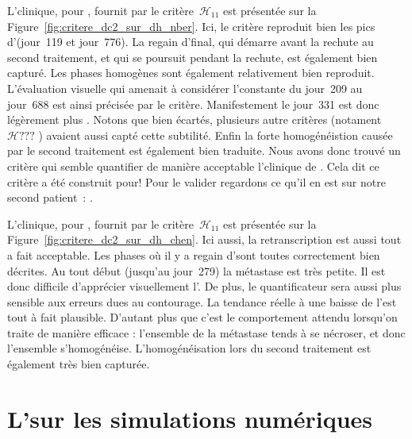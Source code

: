 \documentclass[main.tex]{subfiles}
\begin{document}
L'\hetero clinique, pour \Nber, fournit par le critère~$\mathcal{H}_{11}$ est présentée sur la Figure~\ref{fig:critere_dc2_sur_dh_nber}. Ici, le critère reproduit bien les pics d'\heteros (jour~119 et jour~776). La regain d'\hetero final, qui démarre avant la rechute au second traitement, et qui se poursuit pendant la rechute, est également bien capturé. Les phases homogènes sont également relativement bien reproduit. L'évaluation visuelle qui amenait à considérer l'\hetero constante du jour~209 au jour~688 est ainsi précisée par le critère. Manifestement le jour~331 est donc légèrement plus \hetero. Notons que bien écartés, plusieurs autre critères (notament $\mathcal{H}???$ ) 
avaient aussi capté cette subtilité. Enfin la forte homogénéistion causée par le second traitement est également bien traduite.
Nous avons donc trouvé un critère qui semble quantifier de manière acceptable l'\hetero clinique de \Nber. Cela dit ce critère a été construit pour! Pour le valider regardons ce qu'il en est sur notre second patient~: \Chen.


L'\hetero clinique, pour \Chen, fournit par le critère~$\mathcal{H}_{11}$ est présentée sur la Figure~\ref{fig:critere_dc2_sur_dh_chen}. Ici aussi, la retranscription est aussi tout a fait acceptable. Les phases où il y a regain d'\hetero sont toutes correctement bien décrites. Au tout début (jusqu'au jour~279) la métastase est très petite. Il est donc difficile d'apprécier visuellement l'\hetero. De plus, le quantificateur sera aussi plus sensible aux erreurs dues au contourage. La tendance réelle à une baisse de l'\hetero est tout à fait plausible. D'autant plus que c'est le comportement attendu lorsqu'on traite de manière efficace : l'ensemble de la métastase tends à se nécroser, et donc l'ensemble s'homogénéise.
L'homogénéisation lors du second traitement est également très bien capturée.
\section{L'\hetero sur les simulations numériques}
\end{document}
